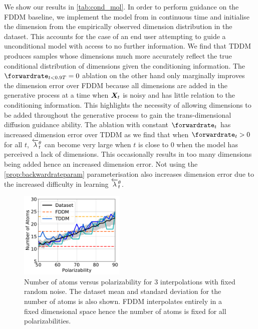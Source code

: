 We show our results in \cref{tab:cond_mol}. In order to perform guidance on the FDDM baseline, we implement the model from \cite{hoogeboom2022equivariant} in continuous time and initialise the dimension from the empirically observed dimension distribution in the dataset.  This accounts for the case of an end user attempting to guide a unconditional model with access to no further information. We find that TDDM produces samples whose dimensions much more accurately reflect the true conditional distribution of dimensions given the conditioning information.
The $\forwardrate_{t<0.9T} = 0$ ablation on the other hand only marginally improves the dimension error over FDDM because all dimensions are added in the generative process at a time when ${\bm{X}}_t$ is noisy and has little relation to the conditioning information. This highlights the necessity of allowing dimensions to be added throughout the generative process to gain the trans-dimensional diffusion guidance ability. The ablation with constant $\forwardrate_t$ has increased dimension error over TDDM as we find that when $\forwardrate_t > 0$ for all $t$, $\overleftarrow{\lambda}_t^\theta$ can become very large when $t$ is close to 0 when the model has perceived a lack of dimensions. This occasionally results in too many dimensions being added hence an increased dimension error. Not using the \cref{prop:backwardrateparam} parameterisation also increases dimension error due to the increased difficulty in learning $\overleftarrow{\lambda}_t^\theta$.

\begin{figure}[t]
    \centering
    \includegraphics[width=0.45\textwidth]{figs/tddm/polarizability_vs_num_atoms.pdf}
    \caption{Number of atoms versus polarizability for $3$ interpolations with fixed random noise. The dataset mean and standard deviation for the number of atoms is also shown. FDDM interpolates entirely in a fixed dimensional space hence the number of atoms is fixed for all polarizabilities.}
    \label{fig:tddm-interp_plot}
\end{figure}

